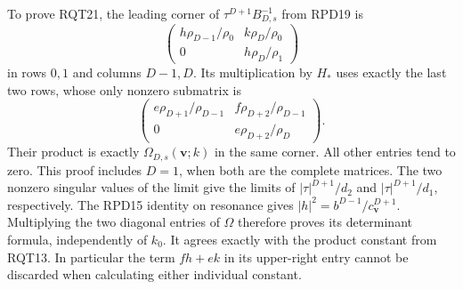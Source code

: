 To prove RQT21, the leading corner of
$\tau^{D+1}B_{D,s}^{-1}$ from RPD19 is
\[
 \begin{pmatrix}
 h\rho_{D-1}/\rho_0&k\rho_D/\rho_0\\
 0&h\rho_D/\rho_1
 \end{pmatrix}
\]
in rows $0,1$ and columns $D-1,D$.
Its multiplication by $H_*$ uses exactly the last two rows,
whose only nonzero submatrix is
\[
 \begin{pmatrix}
 e\rho_{D+1}/\rho_{D-1}&f\rho_{D+2}/\rho_{D-1}\\
 0&e\rho_{D+2}/\rho_D
 \end{pmatrix}.
\]
Their product is exactly $\Omega_{D,s}(\mathbf v;k)$ in the
same corner.  All other entries tend to zero.  This proof includes
$D=1$, when both are the complete matrices.
The two nonzero singular values of the limit give the limits of
$|\tau|^{D+1}/d_2$ and $|\tau|^{D+1}/d_1$, respectively.
The RPD15 identity on resonance gives
$|h|^2=b^{D-1}/c_{\mathbf v}^{D+1}$.
Multiplying the two diagonal entries of $\Omega$ therefore proves
its determinant formula, independently of $k_0$.
It agrees exactly with the product constant from RQT13.
In particular the term $fh+ek$ in its upper-right entry cannot be
discarded when calculating either individual constant.

